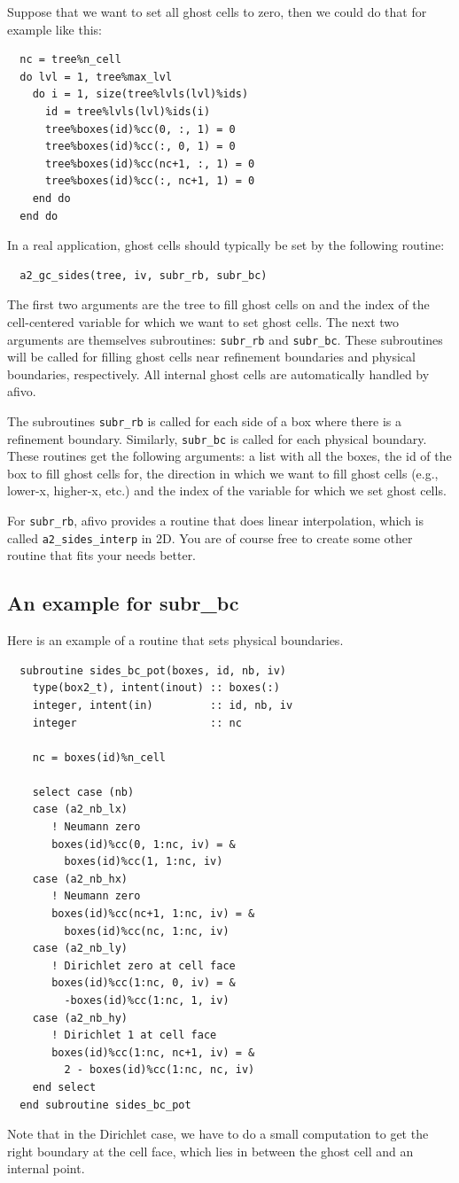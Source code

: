 \documentclass[a4paper, a4wide]{article}
\begin{document}
Suppose that we want to set all ghost cells to zero, then we could do that for
example like this:
\begin{lstlisting}
  nc = tree%n_cell
  do lvl = 1, tree%max_lvl
    do i = 1, size(tree%lvls(lvl)%ids)
      id = tree%lvls(lvl)%ids(i)
      tree%boxes(id)%cc(0, :, 1) = 0
      tree%boxes(id)%cc(:, 0, 1) = 0
      tree%boxes(id)%cc(nc+1, :, 1) = 0
      tree%boxes(id)%cc(:, nc+1, 1) = 0
    end do
  end do
\end{lstlisting}
In a real application, ghost cells should typically be set by the following routine:
\begin{lstlisting}
  a2_gc_sides(tree, iv, subr_rb, subr_bc)
\end{lstlisting}
The first two arguments are the tree to fill ghost cells on and the index of the
cell-centered variable for which we want to set ghost cells.
The next two arguments are themselves subroutines: \texttt{subr\_rb} and
\texttt{subr\_bc}.
These subroutines will be called for filling ghost cells near refinement
boundaries and physical boundaries, respectively.
All internal ghost cells are automatically handled by afivo.

The subroutines \texttt{subr\_rb} is called for each side of a box where there
is a refinement boundary.
Similarly, \texttt{subr\_bc} is called for each physical boundary.
These routines get the following arguments: a list with all the boxes, the id of
the box to fill ghost cells for, the direction in which we want to fill ghost
cells (e.g., lower-x, higher-x, etc.)
and the index of the variable for which we set ghost cells.

For \texttt{subr\_rb}, afivo provides a routine that does linear interpolation,
which is called \texttt{a2\_sides\_interp} in 2D.
You are of course free to create some other routine that fits your needs better.

\subsection{An example for subr\_bc}
\label{sec:ghost-cells-example}

Here is an example of a routine that sets physical boundaries.
\begin{lstlisting}
  subroutine sides_bc_pot(boxes, id, nb, iv)
    type(box2_t), intent(inout) :: boxes(:)
    integer, intent(in)         :: id, nb, iv
    integer                     :: nc

    nc = boxes(id)%n_cell

    select case (nb)
    case (a2_nb_lx)
       ! Neumann zero
       boxes(id)%cc(0, 1:nc, iv) = &
         boxes(id)%cc(1, 1:nc, iv)
    case (a2_nb_hx)
       ! Neumann zero
       boxes(id)%cc(nc+1, 1:nc, iv) = &
         boxes(id)%cc(nc, 1:nc, iv)
    case (a2_nb_ly)
       ! Dirichlet zero at cell face
       boxes(id)%cc(1:nc, 0, iv) = &
         -boxes(id)%cc(1:nc, 1, iv)
    case (a2_nb_hy)
       ! Dirichlet 1 at cell face
       boxes(id)%cc(1:nc, nc+1, iv) = &
         2 - boxes(id)%cc(1:nc, nc, iv)
    end select
  end subroutine sides_bc_pot
\end{lstlisting}

Note that in the Dirichlet case, we have to do a small computation to get the
right boundary at the cell face, which lies in between the ghost cell and an
internal point.
\end{document}
